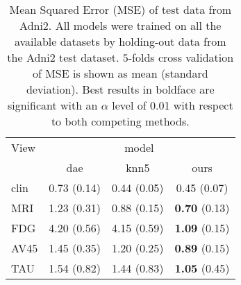 \begin{table}[!t]
\caption{
Mean Squared Error (MSE) of test data from Adni2.
All models were trained on all the available datasets by holding-out data from the Adni2 test dataset.
$5$-folds cross validation of MSE is shown as mean (standard deviation).
Best results in boldface are significant with an $\alpha$ level of 0.01 with respect to both competing methods.
}
\centering
\label{tab:model_comparison}
\begin{tabular}{lccc}
\toprule
View       &          \multicolumn{3}{c}{model}\\
           &          dae &         knn5 &           ours        \\ \cline{2-4}
clin       &  0.73 (0.14) &  0.44 (0.05) &          0.45 (0.07) \\
MRI        &  1.23 (0.31) &  0.88 (0.15) &  \textbf{0.70} (0.13) \\
FDG        &  4.20 (0.56) &  4.15 (0.59) &  \textbf{1.09} (0.15) \\
AV45       &  1.45 (0.35) &  1.20 (0.25) &  \textbf{0.89} (0.15) \\
TAU        &  1.54 (0.82) &  1.44 (0.83) &  \textbf{1.05} (0.45) \\
\bottomrule
\end{tabular}
\end{table}

